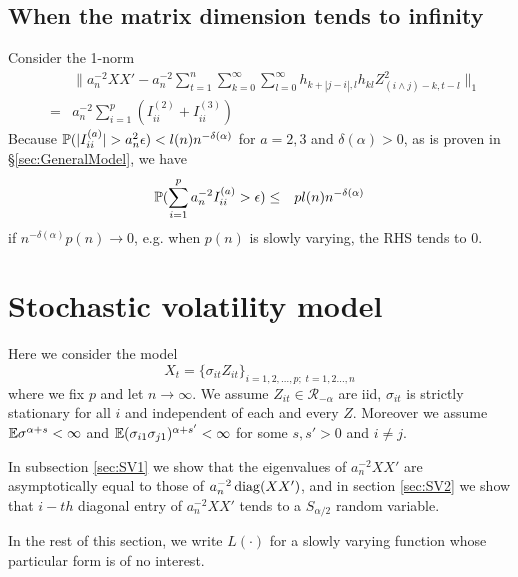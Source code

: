 \documentclass{article}
\begin{document}
\subsection{When the matrix dimension tends to infinity}
Consider the 1-norm
\begin{eqnarray*}
  && \| a_n^{-2} XX' - a_n^{-2} \sum_{t=1}^n
     \sum_{k=0}^\infty \sum_{l=0}^\infty
     h_{k+|j-i|,l} h_{kl} Z_{(i \wedge j) -k, t-l}^2\|_1 \\
  &=& a_n^{-2} \sum_{i=1}^p (I^{(2)}_{ii} + I^{(3)}_{ii})
\end{eqnarray*}
Because $\P(|I^{(a)}_{ii}| > a_n^2 \epsilon) < l(n)
n^{-\delta(\alpha)}$ for $a = 2,3$ and $\delta(\alpha) > 0$, as is
proven in \S\ref{sec:GeneralModel}, we have
\begin{eqnarray*}
  \P(\sum_{i=1}^p a_n^{-2} I^{(a)}_{ii} > \epsilon) &\leq& p l(n)
  n^{-\delta(\alpha)}
\end{eqnarray*}
if $n^{-\delta(\alpha)} p(n) \to 0$, e.g. when $p(n)$ is slowly varying, the RHS
tends to 0.

\fi
\section{Stochastic volatility model}
Here we consider the model
$$
X_t = \{\sigma_{it} Z_{it}\}_{i=1,2,\dots,p;\; t=1,2\dots,n}
$$
where we fix $p$ and let $n \to \infty$. We assume $Z_{it} \in
\mathcal R_{-\alpha}$ are iid, $\sigma_{it}$ is strictly stationary
for all $i$ and independent of each and every $Z$. Moreover we assume
$\E \sigma^{\alpha + s} < \infty$ and $\E (\sigma_{i1}
\sigma_{j1})^{\alpha + s'} < \infty$ for some $s, s' > 0$ and $i \neq j$.

In subsection \ref{sec:SV1} we show that the eigenvalues of $a_n^{-2}
XX'$ are asymptotically equal to those of $a_n^{-2} \diag(XX')$, and
in section \ref{sec:SV2} we show that $i-th$ diagonal entry of
$a_n^{-2} XX'$ tends to a $S_{\alpha/2}$ random variable.

In the rest of this section, we write $L(\cdot)$ for a slowly varying
function whose particular form is of no interest.
\end{document}
